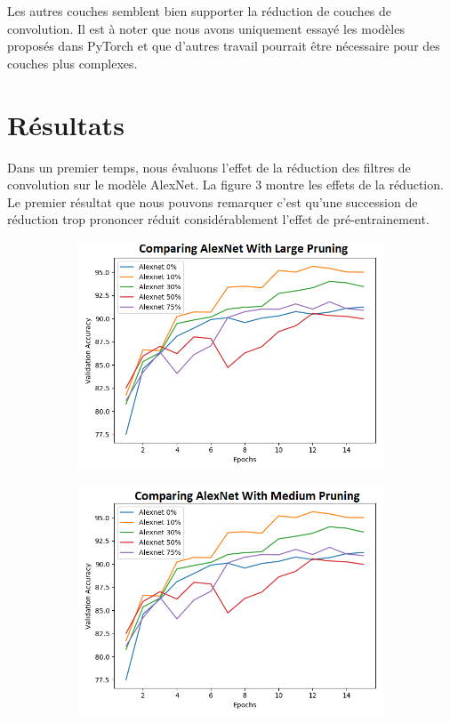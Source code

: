 \documentclass[12pt]{article}
\begin{document}
Les autres couches semblent bien supporter la réduction de couches de convolution. Il est à noter que nous avons uniquement essayé les modèles proposés dans PyTorch et que d'autres travail pourrait être nécessaire pour des couches plus complexes. 

\section*{Résultats}
Dans un premier temps, nous évaluons l’effet de la réduction des filtres de convolution sur le modèle AlexNet. La figure 3 montre les effets de la réduction. Le premier résultat que nous pouvons remarquer c’est qu’une succession de réduction trop prononcer réduit considérablement l’effet de pré-entrainement. 
\begin{figure}[H]
	\centering
	\begin{subfigure}[b]{0.33\textwidth}            
		\includegraphics[width=\textwidth]{prune_ratio_rough}
		\label{fig:pruneratiorough}
	\end{subfigure}%
	\begin{subfigure}[b]{0.33\textwidth}
		\centering
		\includegraphics[width=\textwidth]{prune_ratio_medium}

\end{subfigure}
\end{figure}
\end{document}
